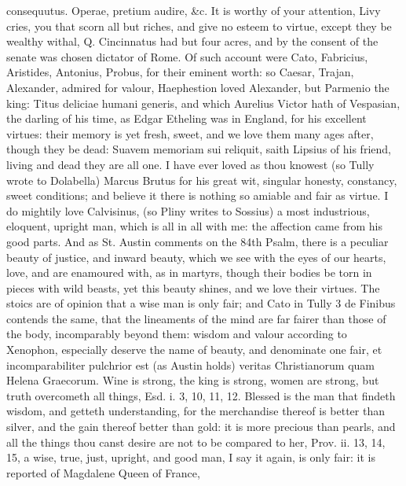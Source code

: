 {consequutus. Operae, pretium audire, \&c. It is worthy of your
attention, Livy cries, you that scorn all but riches, and give no
esteem to virtue, except they be wealthy withal, Q. Cincinnatus had but
four acres, and by the consent of the senate was chosen dictator of
Rome. Of such account were Cato, Fabricius, Aristides, Antonius,
Probus, for their eminent worth: so Caesar, Trajan, Alexander, admired
for valour,  Haephestion loved Alexander, but Parmenio the king:
Titus deliciae humani generis, and which Aurelius Victor hath of
Vespasian, the darling of his time, as Edgar Etheling was in
England, for his excellent virtues: their memory is yet fresh,
sweet, and we love them many ages after, though they be dead: Suavem
memoriam sui reliquit, saith Lipsius of his friend, living and dead
they are all one. I have ever loved as thou knowest (so Tully
wrote to Dolabella) Marcus Brutus for his great wit, singular honesty,
constancy, sweet conditions; and believe it  there is nothing so
amiable and fair as virtue. I do mightily love Calvisinus, (so
Pliny writes to Sossius) a most industrious, eloquent, upright man,
which is all in all with me: the affection came from his good parts.
And as St. Austin comments on the 84th Psalm, there is a peculiar
beauty of justice, and inward beauty, which we see with the eyes of our
hearts, love, and are enamoured with, as in martyrs, though their
bodies be torn in pieces with wild beasts, yet this beauty shines, and
we love their virtues. The stoics are of opinion that a wise man
is only fair; and Cato in Tully 3 de Finibus contends the same, that
the lineaments of the mind are far fairer than those of the body,
incomparably beyond them: wisdom and valour according to
Xenophon, especially deserve the name of beauty, and denominate
one fair, et incomparabiliter pulchrior est (as Austin holds) veritas
Christianorum quam Helena Graecorum. Wine is strong, the king is
strong, women are strong, but truth overcometh all things, Esd. i. 3,
10, 11, 12. Blessed is the man that findeth wisdom, and getteth
understanding, for the merchandise thereof is better than silver, and
the gain thereof better than gold: it is more precious than pearls, and
all the things thou canst desire are not to be compared to her, Prov.
ii. 13, 14, 15, a wise, true, just, upright, and good man, I say it
again, is only fair: it is reported of Magdalene Queen of France,
}
